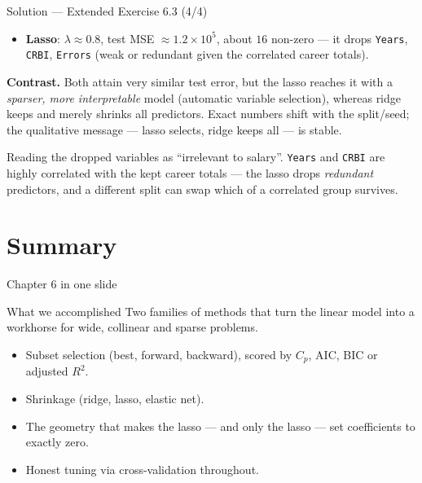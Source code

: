 \documentclass[aspectratio=169,11pt]{beamer}
\begin{document}
\begin{frame}{Solution --- Extended Exercise 6.3 (4/4)}
  \begin{solutionbox}
  \begin{itemize}
      \item \textbf{Lasso}: $\lambda\approx0.8$, test MSE
            $\approx1.2\times10^5$, about $16$ non-zero --- it drops
            \texttt{Years}, \texttt{CRBI}, \texttt{Errors} (weak or
            redundant given the correlated career totals).
    \end{itemize}
    \textbf{Contrast.} Both attain very similar test error, but the lasso
    reaches it with a \emph{sparser, more interpretable} model (automatic
    variable selection), whereas ridge keeps and merely shrinks all
    predictors. Exact numbers shift with the split/seed; the qualitative
    message --- lasso selects, ridge keeps all --- is stable.
  \end{solutionbox}
  \begin{mistake}
    Reading the dropped variables as ``irrelevant to salary''.
    \texttt{Years} and \texttt{CRBI} are highly correlated with the kept
    career totals --- the lasso drops \emph{redundant} predictors, and a
    different split can swap which of a correlated group survives.
  \end{mistake}
\end{frame}

\section{Summary}

\begin{frame}{Chapter 6 in one slide}
  \begin{block}{What we accomplished}
    Two families of methods that turn the linear model into a workhorse
    for wide, collinear and sparse problems.
  \end{block}
  \begin{itemize}
    \item Subset selection (best, forward, backward), scored by $C_p$,
          AIC, BIC or adjusted $R^2$.
    \item Shrinkage (ridge, lasso, elastic net).
    \item The geometry that makes the lasso --- and only the lasso ---
          set coefficients to exactly zero.
    \item Honest tuning via cross-validation throughout.
  \end{itemize}
\end{frame}
\end{document}
